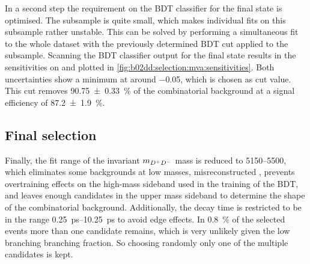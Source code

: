 In a second step the requirement on the BDT classifier for the \KKpiKpipi
final state is optimised. The \KKpiKpipi subsample is quite small, which makes
individual fits on this subsample rather unstable. This can be solved by
performing a simultaneous fit to the whole dataset with the previously
determined BDT cut applied to the \KpipiKpipi subsample. Scanning the BDT
classifier output for the \KKpiKpipi final state results in the sensitivities
on \SDD and \CDD plotted in \cref{fig:b02dd:selection:mva:sensitivities}. Both
uncertainties show a minimum at around \num{-0.05}, which is chosen as cut
value. This cut removes \SI{90.75\pm0.33}{\percent} of the combinatorial
background at a signal efficiency of \SI{87.2\pm1.9}{\percent}.

\subsection{Final selection}
\label{sec:b02dd:selection:final_selection}

Finally, the fit range of the invariant $m_{{{D}^+}{{D}^-}}$ mass is reduced to
\SIrange{5150}{5500}{\MeVcc}, which eliminates some backgrounds at low masses,
\eg misreconstructed \BdToDstD, prevents overtraining effects on the high-mass
sideband used in the training of the BDT, and leaves enough candidates in the
upper mass sideband to determine the shape of the combinatorial background.
Additionally, the decay time is restricted to be in the range
\SIrange{0.25}{10.25}{\ps} to avoid edge effects. In \SI{0.8}{\percent} of the
selected events more than one candidate remains, which is very unlikely given
the low branching branching fraction. So choosing randomly only one of the
multiple candidates is kept.

\clearpage
